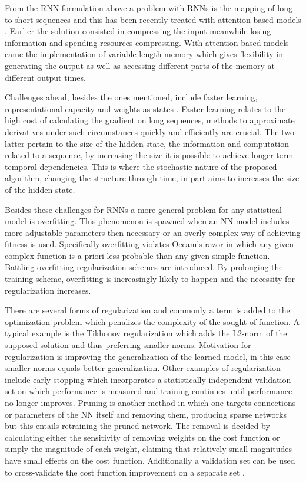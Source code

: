 From the RNN formulation above a problem with RNNs is the mapping of long to short sequences and this has been recently treated with attention-based models \cite{xu}. Earlier the solution consisted in compressing the input meanwhile losing information and spending resources compressing. With attention-based models came the implementation of variable length memory which gives flexibility in generating the output as well as accessing different parts of the memory at different output times. 

Challenges ahead, besides the ones mentioned, include faster learning, representational capacity and weights as states \cite{suts}. Faster learning relates to the high cost of calculating the gradient on long sequences, methods to approximate derivatives under such circumstances quickly and efficiently are crucial. The two latter pertain to the size of the hidden state, the information and computation related to a sequence, by increasing the size it is possible to achieve longer-term temporal dependencies. This is where the stochastic nature of the proposed algorithm, changing the structure through time, in part aims to increases the size of the hidden state.

Besides these challenges for RNNs a more general problem for any statistical model is overfitting. This phenomenon is spawned when an NN model includes more adjustable parameters then necessary or an overly complex way of achieving fitness is used. Specifically overfitting violates Occam's razor in which any given complex function is a priori less probable than any given simple function. Battling overfitting regularization schemes are introduced. By prolonging the training scheme, overfitting is increasingly likely to happen and the necessity for regularization increases.

There are several forms of regularization and commonly a term is added to the optimization problem which penalizes the complexity of the sought of function. A typical example is the Tikhonov regularization which adds the L2-norm of the supposed solution and thus preferring smaller norms. Motivation for regularization is improving the generalization of the learned model, in this case smaller norms equals better generalization. Other examples of regularization include early stopping which incorporates a statistically independent validation set on which performance is measured and training continues until performance no longer improves. Pruning is another method in which one targets connections or parameters of the NN itself and removing them, producing sparse networks but this entails retraining the pruned network. The removal is decided by calculating either the sensitivity of removing weights on the cost function or simply the magnitude of each weight, claiming that relatively small magnitudes have small effects on the cost function. Additionally a validation set can be used to cross-validate the cost function improvement on a separate set \cite{prunings}. 

